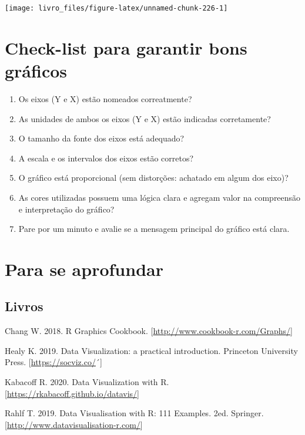 \documentclass[
]{book}
\begin{document}
\begin{center}\texttt{[image: livro\_files/figure-latex/unnamed-chunk-226-1]} \end{center}

\hypertarget{check-list-para-garantir-bons-gruxe1ficos}{%
\section{Check-list para garantir bons gráficos}\label{check-list-para-garantir-bons-gruxe1ficos}}

\begin{enumerate}
\def\labelenumi{\arabic{enumi}.}
\item
  Os eixos (Y e X) estão nomeados correatmente?
\item
  As unidades de ambos os eixos (Y e X) estão indicadas corretamente?
\item
  O tamanho da fonte dos eixos está adequado?
\item
  A escala e os intervalos dos eixos estão corretos?
\item
  O gráfico está proporcional (sem distorções: achatado em algum dos eixo)?
\item
  As cores utilizadas possuem uma lógica clara e agregam valor na compreensão e interpretação do gráfico?
\item
  Pare por um minuto e avalie se a mensagem principal do gráfico está clara.
\end{enumerate}

\hypertarget{para-se-aprofundar-2}{%
\section{Para se aprofundar}\label{para-se-aprofundar-2}}

\hypertarget{livros-1}{%
\subsection{Livros}\label{livros-1}}

Chang W. 2018. R Graphics Cookbook. {[}\url{http://www.cookbook-r.com/Graphs/}{]}

Healy K. 2019. Data Visualization: a practical introduction. Princeton University Press. {[}\url{https://socviz.co/}´{]}

Kabacoff R. 2020. Data Visualization with R. {[}\url{https://rkabacoff.github.io/datavis/}{]}

Rahlf T. 2019. Data Visualisation with R: 111 Examples. 2ed. Springer. {[}\url{http://www.datavisualisation-r.com/}{]}
\end{document}
